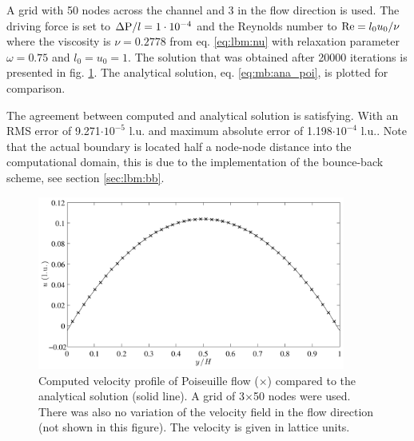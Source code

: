 A grid with 50 nodes across the channel and 3 in the flow direction
is used. The driving force is set to $\Delta \mathrm{P} / l = 1\cdot 10^{-4}$ and
the Reynolds number to $\mathrm{Re} = l_0 u_0/\nu$ where the viscosity
is $\nu = 0.2778$ from eq. \eqref{eq:lbm:nu} with relaxation parameter $\omega = 0.75$ and
$l_0 = u_0 = 1$. The solution that was obtained after 20000
iterations is presented in fig. \ref{fig:mb:poi}. The analytical
solution, eq. \eqref{eq:mb:ana_poi}, is plotted for comparison.

The agreement between computed and analytical solution is
satisfying. With an RMS error of 9.271$\cdot 10^{-5}$ l.u. and maximum
absolute error of 1.198$\cdot10^{-4}$ l.u.. Note that the actual boundary
is located half a node-node distance into the computational domain,
this is due to the implementation of the bounce-back scheme, see
section \ref{sec:lbm:bb}.  

\begin{figure}
\begin{center}
\includegraphics[width=0.9\textwidth]{fig/poiseuille.pdf}
\end{center}
\caption{Computed velocity profile of Poiseuille flow ($\times$)
  compared to the analytical solution (solid line). A grid of
  3$\times$50 nodes were used. There was also no variation of the
  velocity field in the flow direction (not shown in this
  figure). The velocity is given in lattice units.}
\label{fig:mb:poi}
\end{figure}

